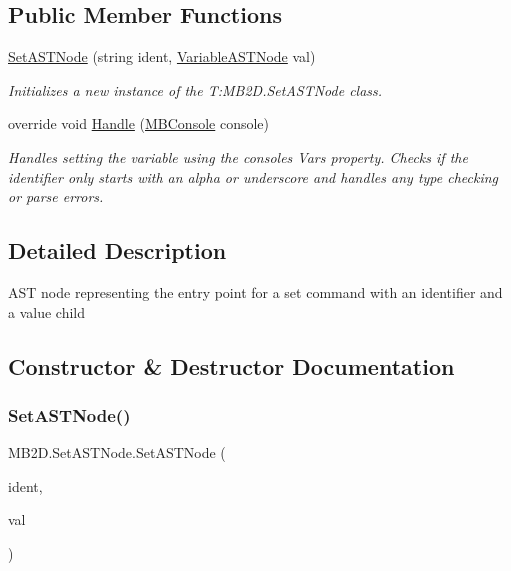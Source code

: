 \subsection*{Public Member Functions}
\begin{DoxyCompactItemize}
\item 
\hyperlink{class_m_b2_d_1_1_set_a_s_t_node_a1c4e7b10e1e9187e692f3dbea9a99887}{Set\+A\+S\+T\+Node} (string ident, \hyperlink{class_m_b2_d_1_1_variable_a_s_t_node}{Variable\+A\+S\+T\+Node} val)
\begin{DoxyCompactList}\small\item\em Initializes a new instance of the T\+:\+M\+B2\+D.\+Set\+A\+S\+T\+Node class. \end{DoxyCompactList}\item 
override void \hyperlink{class_m_b2_d_1_1_set_a_s_t_node_a54eba248a545f6182c6a5509c4c1a6f2}{Handle} (\hyperlink{class_m_b2_d_1_1_m_b_console}{M\+B\+Console} console)
\begin{DoxyCompactList}\small\item\em Handles setting the variable using the consoles Vars property. Checks if the identifier only starts with an alpha or underscore and handles any type checking or parse errors. \end{DoxyCompactList}\end{DoxyCompactItemize}


\subsection{Detailed Description}
A\+ST node representing the entry point for a \textquotesingle{}set\textquotesingle{} command with an identifier and a value child 



\subsection{Constructor \& Destructor Documentation}
\hypertarget{class_m_b2_d_1_1_set_a_s_t_node_a1c4e7b10e1e9187e692f3dbea9a99887}{}\label{class_m_b2_d_1_1_set_a_s_t_node_a1c4e7b10e1e9187e692f3dbea9a99887} 
\subsubsection{\texorpdfstring{Set\+A\+S\+T\+Node()}{SetASTNode()}}
{\footnotesize\ttfamily M\+B2\+D.\+Set\+A\+S\+T\+Node.\+Set\+A\+S\+T\+Node (\begin{DoxyParamCaption}\item[{string}]{ident,  }\item[{\hyperlink{class_m_b2_d_1_1_variable_a_s_t_node}{Variable\+A\+S\+T\+Node}}]{val }\end{DoxyParamCaption})\hspace{0.3cm}{\ttfamily [inline]}}



